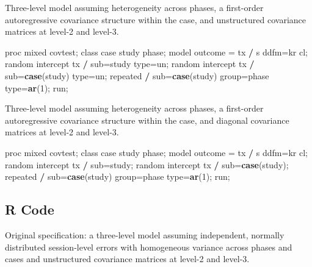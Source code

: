 \documentclass[
]{book}
\newenvironment{Shaded}{\begin{snugshade}}{\end{snugshade}}
\newcommand{\DecValTok}[1]{\textcolor[rgb]{0.00,0.00,0.81}{#1}}
\newcommand{\FunctionTok}[1]{\textcolor[rgb]{0.13,0.29,0.53}{\textbf{#1}}}
\newcommand{\NormalTok}[1]{#1}
\newcommand{\OtherTok}[1]{\textcolor[rgb]{0.56,0.35,0.01}{#1}}
\newcommand{\SpecialCharTok}[1]{\textcolor[rgb]{0.81,0.36,0.00}{\textbf{#1}}}
\begin{document}
Three-level model assuming heterogeneity across phases, a first-order autoregressive covariance structure within the case, and unstructured covariance matrices at level-2 and level-3.

\begin{Shaded}
\begin{Highlighting}[]
\NormalTok{proc mixed covtest;}
\NormalTok{class case study phase;}
\NormalTok{model outcome }\OtherTok{=}\NormalTok{ tx }\SpecialCharTok{/}\NormalTok{ s ddfm}\OtherTok{=}\NormalTok{kr cl;}
\NormalTok{random intercept tx }\SpecialCharTok{/}\NormalTok{ sub}\OtherTok{=}\NormalTok{study type}\OtherTok{=}\NormalTok{un;}
\NormalTok{random intercept tx }\SpecialCharTok{/}\NormalTok{ sub}\OtherTok{=}\FunctionTok{case}\NormalTok{(study) type}\OtherTok{=}\NormalTok{un;}
\NormalTok{repeated }\SpecialCharTok{/}\NormalTok{ sub}\OtherTok{=}\FunctionTok{case}\NormalTok{(study) group}\OtherTok{=}\NormalTok{phase type}\OtherTok{=}\FunctionTok{ar}\NormalTok{(}\DecValTok{1}\NormalTok{);}
\NormalTok{run;}
\end{Highlighting}
\end{Shaded}

Three-level model assuming heterogeneity across phases, a first-order autoregressive covariance structure within the case, and diagonal covariance matrices at level-2 and level-3.

\begin{Shaded}
\begin{Highlighting}[]
\NormalTok{proc mixed covtest;}
\NormalTok{class case study phase;}
\NormalTok{model outcome }\OtherTok{=}\NormalTok{ tx }\SpecialCharTok{/}\NormalTok{ s ddfm}\OtherTok{=}\NormalTok{kr cl;}
\NormalTok{random intercept tx }\SpecialCharTok{/}\NormalTok{ sub}\OtherTok{=}\NormalTok{study;}
\NormalTok{random intercept tx }\SpecialCharTok{/}\NormalTok{ sub}\OtherTok{=}\FunctionTok{case}\NormalTok{(study);}
\NormalTok{repeated }\SpecialCharTok{/}\NormalTok{ sub}\OtherTok{=}\FunctionTok{case}\NormalTok{(study) group}\OtherTok{=}\NormalTok{phase type}\OtherTok{=}\FunctionTok{ar}\NormalTok{(}\DecValTok{1}\NormalTok{);}
\NormalTok{run;}
\end{Highlighting}
\end{Shaded}

\hypertarget{r-code}{%
\subsection{R Code}\label{r-code}}

Original specification: a three-level model assuming independent, normally distributed session-level errors with homogeneous variance across phases and cases and unstructured covariance matrices at level-2 and level-3.
\end{document}
